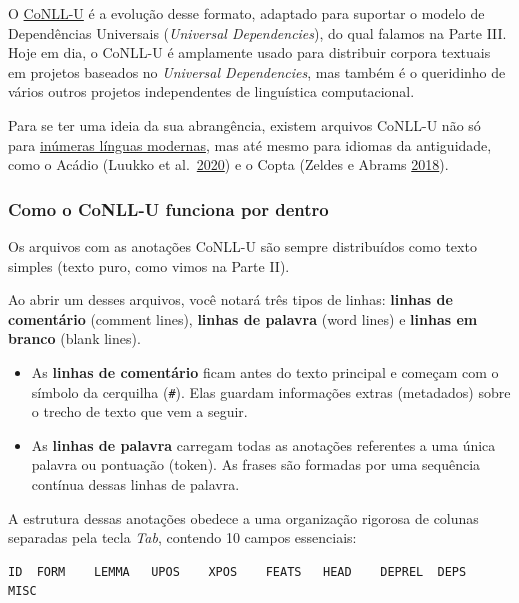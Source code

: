 \documentclass[
  brazilian,
]{article}
\providecommand{\tightlist}{%
  \setlength{\itemsep}{0pt}\setlength{\parskip}{0pt}}
\begin{document}
O \href{https://universaldependencies.org/format.html}{CoNLL-U} é a
evolução desse formato, adaptado para suportar o modelo de Dependências
Universais (\emph{Universal Dependencies}), do qual falamos na Parte
III. Hoje em dia, o CoNLL-U é amplamente usado para distribuir corpora
textuais em projetos baseados no \emph{Universal Dependencies}, mas
também é o queridinho de vários outros projetos independentes de
linguística computacional.

Para se ter uma ideia da sua abrangência, existem arquivos CoNLL-U não
só para \href{https://universaldependencies.org/}{inúmeras línguas
modernas}, mas até mesmo para idiomas da antiguidade, como o Acádio
(Luukko et
al.~\href{https://www.aclweb.org/anthology/2020.tlt-1.11}{2020}) e o
Copta (Zeldes e Abrams
\href{https://www.aclweb.org/anthology/W18-6022}{2018}).

\hypertarget{como-o-conll-u-funciona-por-dentro}{%
\subsubsection{Como o CoNLL-U funciona por
dentro}\label{como-o-conll-u-funciona-por-dentro}}

Os arquivos com as anotações CoNLL-U são sempre distribuídos como texto
simples (texto puro, como vimos na Parte II).

Ao abrir um desses arquivos, você notará três tipos de linhas:
\textbf{linhas de comentário} (comment lines), \textbf{linhas de
palavra} (word lines) e \textbf{linhas em branco} (blank lines).

\begin{itemize}
\tightlist
\item
  As \textbf{linhas de comentário} ficam antes do texto principal e
  começam com o símbolo da cerquilha (\texttt{\#}). Elas guardam
  informações extras (metadados) sobre o trecho de texto que vem a
  seguir.
\item
  As \textbf{linhas de palavra} carregam todas as anotações referentes a
  uma única palavra ou pontuação (token). As frases são formadas por uma
  sequência contínua dessas linhas de palavra.
\end{itemize}

A estrutura dessas anotações obedece a uma organização rigorosa de
colunas separadas pela tecla \emph{Tab}, contendo 10 campos essenciais:

\begin{verbatim}
ID  FORM    LEMMA   UPOS    XPOS    FEATS   HEAD    DEPREL  DEPS    MISC
\end{verbatim}
\end{document}
